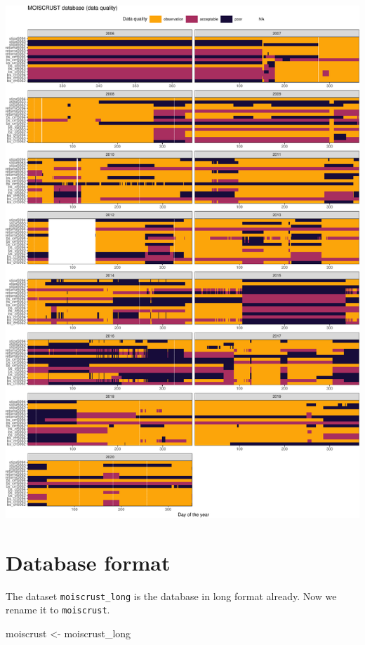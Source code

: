 \documentclass[]{article}
\newenvironment{Shaded}{\begin{snugshade}}{\end{snugshade}}
\newcommand{\NormalTok}[1]{#1}
\newcommand{\StringTok}[1]{\textcolor[rgb]{0.31,0.60,0.02}{#1}}
\begin{document}
\includegraphics{moiscrust_files/figure-latex/unnamed-chunk-30-1.pdf}

\hypertarget{database-format}{%
\section{Database format}\label{database-format}}

The dataset \texttt{moiscrust\_long} is the database in long format
already. Now we rename it to \texttt{moiscrust}.

\begin{Shaded}
\begin{Highlighting}[]
\NormalTok{moiscrust <-}\StringTok{ }\NormalTok{moiscrust_long}
\end{Highlighting}
\end{Shaded}
\end{document}
